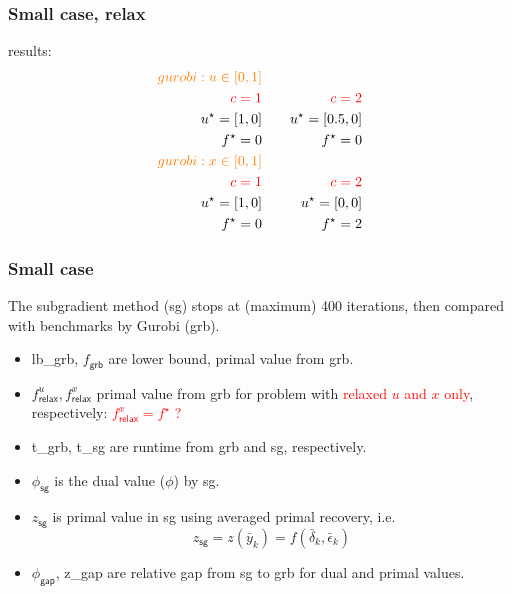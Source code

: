\begin{frame}
  \frametitle{Small case, relax}
  results:
  \begin{align*}
    \textcolor{orange}{gurobi:  u \in [0, 1]    }          \\
    \textcolor{red}{c = 1} &       & \textcolor{red}{c =2} \\
    u^\star = [1, 0]       & \quad & u^\star = [0.5, 0]    \\
    f^\star = 0            &       & f^\star = 0           \\
    \textcolor{orange}{gurobi:    x \in [0, 1]      }      \\
    \textcolor{red}{c = 1} &       & \textcolor{red}{c =2} \\
    u^\star = [1, 0]       & \quad & u^\star = [0, 0]      \\
    f^\star = 0            &       & f^\star = 2           \\
  \end{align*}
\end{frame}

\begin{frame}
  \frametitle{Small case}

  The subgradient method (sg) stops at (maximum) 400 iterations, then compared with benchmarks by Gurobi (grb).
  \begin{itemize}
    \item lb\_grb, \(f_{\textsf{grb}}\)  are lower bound, primal value from grb.
    \item \(f^u_{\textsf{relax}}, f^x_{\textsf{relax}}\) primal value from grb for problem with \textcolor{red}{relaxed \(u\) and \(x\) only}, respectively: \textcolor{red}{\(f^x_{\textsf{relax}} = f^\star\) ?}
    \item t\_grb, t\_sg are runtime from grb and sg, respectively.
    \item \(\phi_{\textsf{sg}}\) is the dual value (\(\phi\)) by sg.
    \item \(z_{\textsf{sg}}\) is primal value in sg using averaged primal recovery, i.e.
          \[z_{\textsf{sg}} = z(\bar y_k) = f(\bar \delta_k, \bar \epsilon_k)\]
    \item \(\phi_{\textsf{gap}}\), z\_gap are relative gap from sg to grb for dual and primal values.
  \end{itemize}
\end{frame}

